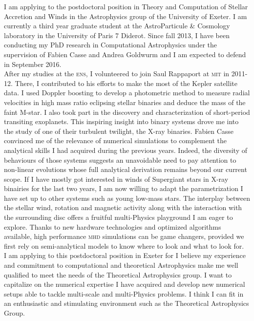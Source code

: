 \documentclass[12pt]{letter}
\begin{document}
\begin{letter} {}
\hspace*{0.5cm} I am applying to the postdoctoral position in Theory and Computation of Stellar Accretion and Winds in the Astrophysics group of the University of Exeter. I am currently a third year graduate student at the AstroParticule \& Cosmology laboratory in the University of Paris 7 Diderot. Since fall 2013, I have been conducting my PhD research in Computational Astrophysics under the supervision of Fabien Casse and Andrea Goldwurm and I am expected to defend in September 2016.\\
\hspace*{0.5cm} After my studies at the \textsc{ens}, I volunteered to join Saul Rappaport at \textsc{mit} in 2011-12. There, I contributed to his efforts to make the most of the Kepler satellite data. I used Doppler boosting to develop a photometric method to measure radial velocities in high mass ratio eclipsing stellar binaries and deduce the mass of the faint M-star. I also took part in the discovery and characterization of short-period transiting exoplanets. This inspiring insight into binary systems drove me into the study of one of their turbulent twilight, the X-ray binaries. Fabien Casse convinced me of the relevance of numerical simulations to complement the analytical skills I had acquired during the previous years. Indeed, the diversity of behaviours of those systems suggests an unavoidable need to pay attention to non-linear evolutions whose full analytical derivation remains beyond our current scope. If I have mostly got interested in winds of Supergiant stars in X-ray binairies for the last two years, I am now willing to adapt the parametrization I have set up to other systems such as young low-mass stars. The interplay between the stellar wind, rotation and magnetic activity along with the interaction with the surrounding disc offers a fruitful multi-Physics playground I am eager to explore. Thanks to new hardware technologies and optimized algorithms available, high performance \textsc{mhd} simulations can be game changers, provided we first rely on semi-analytical models to know where to look and what to look for.\\
\hspace*{0.5cm} I am applying to this postdoctoral position in Exeter for I believe my experience and commitment to computational and theoretical Astrophysics make me well qualified to meet the needs of the Theoretical Astrophysics group. I want to capitalize on the numerical expertise I have acquired and develop new numerical setups able to tackle multi-scale and multi-Physics problems. I think I can fit in an enthusiastic and stimulating environment such as the Theoretical Astrophysics Group.\\

\end{letter}
\end{document}
